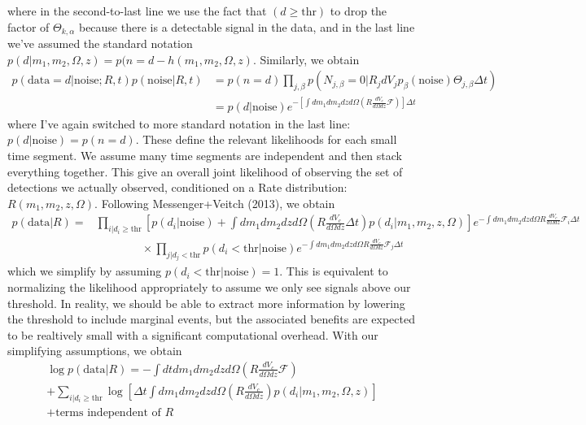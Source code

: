 \documentclass{article}
\begin{document}
where in the second-to-last line we use the fact that $(d\geq\mathrm{thr})$ to drop the factor of $\Theta_{k,\alpha}$ because there is a detectable signal in the data, and in the last line we've assumed the standard notation $p(d|m_1,m_2,\Omega,z)=p(n=d-h(m_1,m_2,\Omega,z)$.
Similarly, we obtain
\begin{align}
    p(\mathrm{data}=d|\mathrm{noise}; R, t)p(\mathrm{noise}|R, t) & = p(n=d) \prod\limits_{j,\beta} p(N_{j,\beta}=0|R_jdV_j p_\beta(\mathrm{noise})\Theta_{j,\beta} \Delta t) \nonumber \\
                                                                & = p(d|\mathrm{noise}) e^{-\left[\int dm_1 dm_2 dz d\Omega \left(R \frac{dV_c}{d\Omega dz} \mathcal{F}\right)\right] \Delta t} 
\end{align}
where I've again switched to more standard notation in the last line: $p(d|\mathrm{noise}) = p(n=d)$.
These define the relevant likelihoods for each small time segment.
We assume many time segments are independent and then stack everything together.
This give an overall joint likelihood of observing the set of detections we actually observed, conditioned on a Rate distribution: $R(m_1, m_2, z, \Omega)$.
Following Messenger+Veitch (2013), we obtain
\begin{align}
    p(\mathrm{data}|R) = & \prod\limits_{i|d_i\geq\mathrm{thr}} \left[ p(d_i|\mathrm{noise}) + \int dm_1 dm_2 dz d\Omega \left( R\frac{dV_c}{d\Omega dz} \Delta t \right) p(d_i|m_1, m_2, z, \Omega) \right] e^{-\int dm_1 dm_2 dz d\Omega R\frac{dV_c}{d\Omega dz} \mathcal{F}_i \Delta t} \nonumber \\
                         & \quad\quad\quad\quad \times \prod\limits_{j|d_j<\mathrm{thr}} p(d_i<\mathrm{thr}|\mathrm{noise}) e^{-\int dm_1 dm_2 dz d\Omega R\frac{dV_c}{d\Omega dz} \mathcal{F}_j \Delta t} 
\end{align}
which we simplify by assuming $p(d_i<\mathrm{thr}|\mathrm{noise}) =1$.
This is equivalent to normalizing the likelihood appropriately to assume we only see signals above our threshold. 
In reality, we should be able to extract more information by lowering the threshold to include marginal events, but the associated benefits are expected to be realtively small with a significant computational overhead.
With our simplifying assumptions, we obtain
\begin{multline}
    \log p(\mathrm{data}|R) = - \int dt dm_1 dm_2 dz d\Omega \left(R \frac{dV_c}{d\Omega dz} \mathcal{F}\right) \\
         + \sum\limits_{i|d_i\geq\mathrm{thr}} \log \left[ \Delta t \int dm_1 dm_2 dz d\Omega \left(R \frac{dV_c}{d\Omega dz} \right) p(d_i|m_1, m_2, \Omega, z) \right] \\
         + \text{terms independent of }R
\end{multline}
\end{document}
